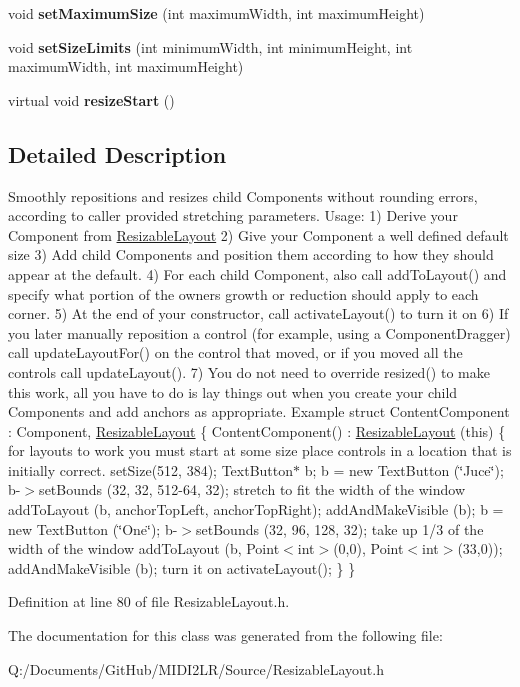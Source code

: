 \begin{DoxyCompactItemize}
\item 
void {\bfseries set\+Maximum\+Size} (int maximum\+Width, int maximum\+Height)\hypertarget{class_resizable_child_ab2e6df2570a948fba95123abe5864a27}{}\label{class_resizable_child_ab2e6df2570a948fba95123abe5864a27}

\item 
void {\bfseries set\+Size\+Limits} (int minimum\+Width, int minimum\+Height, int maximum\+Width, int maximum\+Height)\hypertarget{class_resizable_child_a398c4578e8a3a95aab126e565ddaba83}{}\label{class_resizable_child_a398c4578e8a3a95aab126e565ddaba83}

\item 
virtual void {\bfseries resize\+Start} ()\hypertarget{class_resizable_child_aab700a53db0ffaf68f75bf29fd824b20}{}\label{class_resizable_child_aab700a53db0ffaf68f75bf29fd824b20}

\end{DoxyCompactItemize}


\subsection{Detailed Description}
Smoothly repositions and resizes child Components without rounding errors, according to caller provided stretching parameters. Usage\+: 1) Derive your Component from \hyperlink{class_resizable_layout}{Resizable\+Layout} 2) Give your Component a well defined default size 3) Add child Components and position them according to how they should appear at the default. 4) For each child Component, also call add\+To\+Layout() and specify what portion of the owner\textquotesingle{}s growth or reduction should apply to each corner. 5) At the end of your constructor, call activate\+Layout() to turn it on 6) If you later manually reposition a control (for example, using a Component\+Dragger) call update\+Layout\+For() on the control that moved, or if you moved all the controls call update\+Layout(). 7) You do not need to override resized() to make this work, all you have to do is lay things out when you create your child Components and add anchors as appropriate. Example struct Content\+Component \+: Component, \hyperlink{class_resizable_layout}{Resizable\+Layout} \{ Content\+Component() \+: \hyperlink{class_resizable_layout}{Resizable\+Layout} (this) \{ for layouts to work you must start at some size place controls in a location that is initially correct. set\+Size(512, 384); Text\+Button$\ast$ b; b = new Text\+Button (\char`\"{}\+Juce\char`\"{}); b-\/$>$set\+Bounds (32, 32, 512-\/64, 32); stretch to fit the width of the window add\+To\+Layout (b, anchor\+Top\+Left, anchor\+Top\+Right); add\+And\+Make\+Visible (b); b = new Text\+Button (\char`\"{}\+One\char`\"{}); b-\/$>$set\+Bounds (32, 96, 128, 32); take up 1/3 of the width of the window add\+To\+Layout (b, Point$<$int$>$(0,0), Point$<$int$>$(33,0)); add\+And\+Make\+Visible (b); turn it on activate\+Layout(); \} \} 

Definition at line 80 of file Resizable\+Layout.\+h.



The documentation for this class was generated from the following file\+:\begin{DoxyCompactItemize}
\item 
Q\+:/\+Documents/\+Git\+Hub/\+M\+I\+D\+I2\+L\+R/\+Source/Resizable\+Layout.\+h\end{DoxyCompactItemize}
